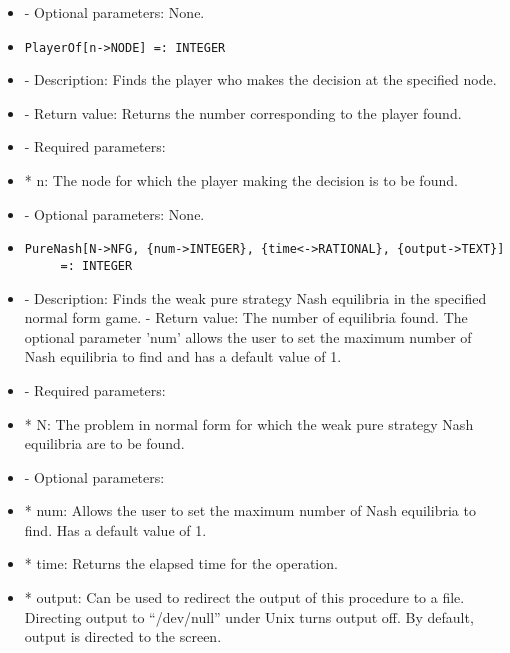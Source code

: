 \begin{itemize}
\item
- Optional parameters:  None.
\ed

\item
\begin{verbatim}
PlayerOf[n->NODE] =: INTEGER
\end{verbatim}

\bd
\item
- Description:  Finds the player who makes the decision at the specified
node.
\item
- Return value:  Returns the number corresponding to the player found.
\item
- Required parameters:

\bd
\item
*  n:  The node for which the player making the decision is to be
found.
\ed

\item
- Optional parameters:  None.
\ed

\item
\begin{verbatim}
PureNash[N->NFG, {num->INTEGER}, {time<->RATIONAL}, {output->TEXT}]
	 =: INTEGER
\end{verbatim}

\bd
\item
- Description:  Finds the weak pure strategy Nash equilibria in the 
specified normal form game.  
- Return value:  The number of equilibria found.  The optional parameter 
'num' allows the user to set the maximum number of Nash equilibria to 
find and has a default value of 1.
\item
- Required parameters:
	
\bd
\item
*  N:  The problem in normal form for which the weak pure strategy
Nash equilibria are to be found.
\ed

\item
- Optional parameters:
	
\bd
\item
*  num:  Allows the user to set the maximum number of Nash equilibria
to find.  Has a default value of 1.
\item
*  time:  Returns the elapsed time for the operation.
\item
*  output:  Can be used to redirect the output of this procedure to a
file.  Directing output to ``/dev/null'' under Unix turns 
output off.  By default, output is directed to the screen.  

\ed
\ed


\end{itemize}
